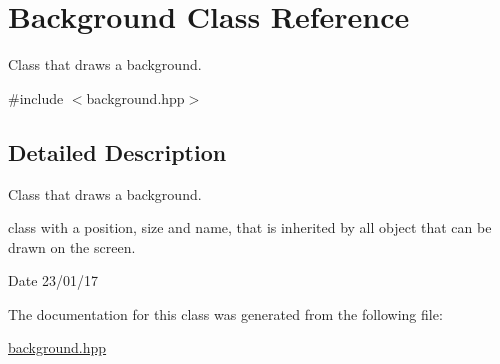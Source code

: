 \hypertarget{class_background}{}\section{Background Class Reference}
\label{class_background}


Class that draws a background.  




{\ttfamily \#include $<$background.\+hpp$>$}



\subsection{Detailed Description}
Class that draws a background. 

class with a position, size and name, that is inherited by all object that can be drawn on the screen.

\begin{DoxyDate}{Date}
23/01/17 
\end{DoxyDate}


The documentation for this class was generated from the following file\+:\begin{DoxyCompactItemize}
\item 
\hyperlink{background_8hpp}{background.\+hpp}\end{DoxyCompactItemize}
